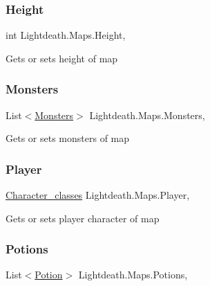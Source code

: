 \subsubsection{\texorpdfstring{Height}{Height}}
{\footnotesize\ttfamily int Lightdeath.\+Maps.\+Height\hspace{0.3cm}{\ttfamily [get]}, {\ttfamily [set]}}



Gets or sets height of map 

\hypertarget{class_lightdeath_1_1_maps_a90188e7f4e8ffd7e90e4121a3f2ec114}{}\label{class_lightdeath_1_1_maps_a90188e7f4e8ffd7e90e4121a3f2ec114} 
\subsubsection{\texorpdfstring{Monsters}{Monsters}}
{\footnotesize\ttfamily List$<$\hyperlink{class_lightdeath_1_1_monsters}{Monsters}$>$ Lightdeath.\+Maps.\+Monsters\hspace{0.3cm}{\ttfamily [get]}, {\ttfamily [set]}}



Gets or sets monsters of map 

\hypertarget{class_lightdeath_1_1_maps_adb2618cdaa5a0ceb621b59d963956c9d}{}\label{class_lightdeath_1_1_maps_adb2618cdaa5a0ceb621b59d963956c9d} 
\subsubsection{\texorpdfstring{Player}{Player}}
{\footnotesize\ttfamily \hyperlink{class_lightdeath_1_1_character__classes}{Character\+\_\+classes} Lightdeath.\+Maps.\+Player\hspace{0.3cm}{\ttfamily [get]}, {\ttfamily [set]}}



Gets or sets player character of map 

\hypertarget{class_lightdeath_1_1_maps_af8070646d93782021f72a96dca1721f7}{}\label{class_lightdeath_1_1_maps_af8070646d93782021f72a96dca1721f7} 
\subsubsection{\texorpdfstring{Potions}{Potions}}
{\footnotesize\ttfamily List$<$\hyperlink{class_lightdeath_1_1_potion}{Potion}$>$ Lightdeath.\+Maps.\+Potions\hspace{0.3cm}{\ttfamily [get]}, {\ttfamily [set]}}



